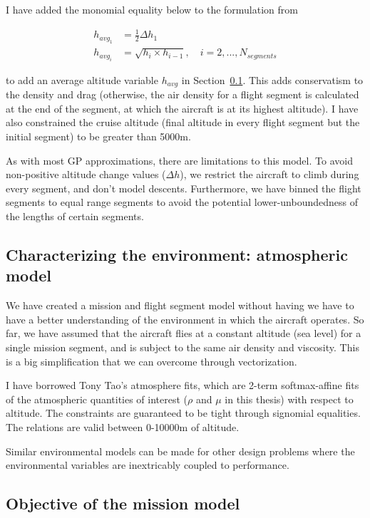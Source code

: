 I have added the monomial equality below to the formulation from~\cite{gassolar}

\begin{align}
    h_{{avg}_1} &= \frac{1}{2}\Delta h_1 \\
    h_{{avg}_i} &= \sqrt{h_{i} \times h_{i-1}}, \quad i = 2,...,N_{segments}
\end{align}

to add an average altitude variable $h_{avg}$ in Section~\ref{s:atmos}. This adds
conservatism to the density and drag (otherwise, the air density for a flight segment is calculated
at the end of the segment, at which the aircraft is at its highest altitude). I have also constrained
the cruise altitude (final altitude in every flight segment but the initial segment) to be greater than 5000m.

As with most \gls{GP} approximations, there are limitations to this model. To avoid non-positive
altitude change values ($\Delta h$), we restrict the aircraft to climb during every segment, and
don't model descents. Furthermore, we have binned the flight segments to equal range segments to
avoid the potential lower-unboundedness of the lengths of certain segments.

\subsection{Characterizing the environment: atmospheric model}
\label{s:atmos}

We have created a mission and flight segment model without having we have to have a better understanding
of the environment in which the aircraft operates. So far, we have assumed that
the aircraft flies at a constant altitude (sea level) for a single mission segment,
and is subject to the same air density and viscosity. This is a big simplification
that we can overcome through vectorization.

I have borrowed Tony Tao's atmosphere fits, which are 2-term softmax-affine fits of the atmospheric
quantities of interest ($\rho$ and $\mu$ in this thesis) with respect to altitude. The constraints
are guaranteed to be tight through signomial equalities.
The relations are valid between 0-10000m of altitude.

Similar environmental models can be made for other design problems where the environmental
variables are inextricably coupled to performance.

\subsection{Objective of the mission model}

